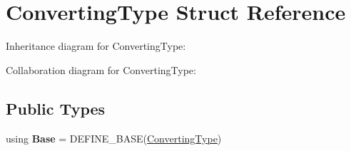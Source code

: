 \hypertarget{struct_converting_type}{}\section{Converting\+Type Struct Reference}
\label{struct_converting_type}


Inheritance diagram for Converting\+Type\+:


Collaboration diagram for Converting\+Type\+:
\subsection*{Public Types}
\begin{DoxyCompactItemize}
\item 
\mbox{\label{struct_converting_type_a56035fa2f6b80594f54f712460a165ac}} 
using {\bfseries Base} = D\+E\+F\+I\+N\+E\+\_\+\+B\+A\+SE(\mbox{\hyperlink{struct_converting_type}{Converting\+Type}})
\end{DoxyCompactItemize}
